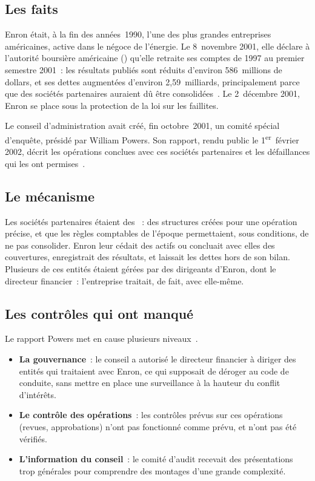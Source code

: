 \subsection{Les faits}

Enron était, à la fin des années~1990, l'une des plus grandes entreprises
américaines, active dans le négoce de l'énergie. Le 8~novembre 2001, elle
déclare à l'autorité boursière américaine () qu'elle retraite
ses comptes de 1997 au premier semestre 2001~: les résultats publiés sont
réduits d'environ 586~millions de dollars, et ses dettes augmentées
d'environ 2,59~milliards, principalement parce que des sociétés partenaires
auraient dû être consolidées~\cite{enron2001restatement}. Le 2~décembre
2001, Enron se place sous la protection de la loi sur les faillites.

Le conseil d'administration avait créé, fin octobre~2001, un comité
spécial d'enquête, présidé par William Powers. Son rapport, rendu public le
1\textsuperscript{er}~février 2002, décrit les opérations conclues avec ces
sociétés partenaires et les défaillances qui les ont
permises~\cite{powers2002enron}.

\subsection{Le mécanisme}

Les sociétés partenaires étaient des ~: des structures créées pour une opération
précise, et que les règles comptables de l'époque permettaient, sous
conditions, de ne pas consolider. Enron leur cédait des actifs ou concluait
avec elles des couvertures, enregistrait des résultats, et laissait les
dettes hors de son bilan. Plusieurs de ces entités étaient gérées par des
dirigeants d'Enron, dont le directeur financier~: l'entreprise traitait,
de fait, avec elle-même.

\subsection{Les contrôles qui ont manqué}

Le rapport Powers met en cause plusieurs niveaux~\cite{powers2002enron}.
\begin{itemize}
    \item \textbf{La gouvernance}~: le conseil a autorisé le directeur
          financier à diriger des entités qui traitaient avec Enron, ce qui
          supposait de déroger au code de conduite, sans mettre en place une
          surveillance à la hauteur du conflit d'intérêts.
    \item \textbf{Le contrôle des opérations}~: les contrôles prévus sur ces
          opérations (revues, approbations) n'ont pas fonctionné comme
          prévu, et n'ont pas été vérifiés.
    \item \textbf{L'information du conseil}~: le comité d'audit recevait des
          présentations trop générales pour comprendre des montages d'une
          grande complexité.
\end{itemize}

